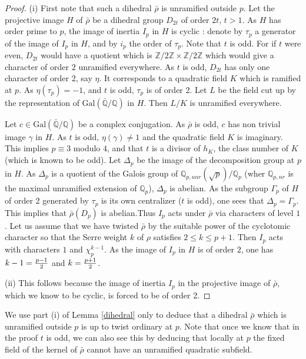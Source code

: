 \documentclass[12pt]{amsart}
\newcommand{\Q}{\mathbb{Q}}
\newcommand{\Z}{\mathbb{Z}}
\newcommand{\rhobar}{\overline{\rho}}
\def\rhobar{ {\bar {\rho} } }
\def\rhob{ {\bar {\rho} } }
\newcommand{\Galois}{\mathrm{Gal}}
\newcommand{\Gal}{\Galois( \bar{ {\mathbb Q}}/{\mathbb Q})}
\begin{document}
\begin{proof} (i) First note that such a dihedral $\rhobar$
is unramified outside $p$. Let the projective
image $H$ of $\rhobar$ be a dihedral group $D_{2t}$ of order $2t$, $t>1$.
As $H$ has order prime to $p$, the image of inertia $I_p$ in $H$ is cyclic
: denote by $\tau _p$ a generator of the image of $I_p$ in $H$, and by $i_p$ the order of $\tau_p$.
Note that $t$ is odd. For if $t$ were even, $D_{2t}$ would have
a quotient which is $\Z/2\Z \times \Z/2\Z$ which would give
a character of order $2$ unramified everywhere.
As $t$ is odd, $D_{2t}$ has only one
character of order $2$, say $\eta$. It corresponds to a quadratic
field $K$ which is ramified at $p$. As $\eta (\tau _p )=-1$,
and $t$ is odd, $\tau _p$ is of order $2$.
Let $L$ be the field cut up by the representation
of $\Gal$ in $H$. Then $L/K$ is unramified everywhere.

Let $c\in \Gal$ be a complex conjugation. As $\rhob$ is odd,
$c$ has non trivial image $\gamma$  in $H$. As $t$ is odd,
$\eta (\gamma)\neq 1$ and
the quadratic field  $K$ is imaginary. This implies
$p \equiv 3$ modulo $4$, and that $t$ is a divisor of $h_K$,
the class number of $K$ (which is known to be odd). Let $\Delta _p$ be the image of the decomposition group
at $p$ in $H$. As  $\Delta _p$ is a quotient of the Galois
group of $\Q_{p,unr}(\sqrt{p} )/\Q_p$ (wher $\Q_{p,nr}$ is the maximal unramified extension of $\Q_p$), $\Delta _p$ is
abelian. As the subgroup $\Gamma_p$ of $H$ of order $2$
generated by  $\tau _p$ is its own centralizer ($t$ is odd),
one sees that $\Delta _p=\Gamma_p$. This implies that $\rhobar(D_p)$ is abelian.Thus $I_p$ acts under
$\rhob$ via characters of level $1$.
Let us assume that we have twisted $\rhob$ by the suitable
power of the cyclotomic character so that
the Serre weight $k$ of $\rho$  satisfies $2\leq k\leq p+1$.
Then $I_p$ acts with characters $1$ and $\chi_p ^{k-1}$.
As the image of $I_p$ in $H$ is of order $2$, one has $k-1= {p-1 \over 2}$
and $k={p+1 \over 2}$.

(ii) This follows because the image of inertia $I_p$ in the projective 
image of $\rhob$, which we know to be cyclic, is forced to be of order 2.
\end{proof}

 We use part (i) of Lemma \ref{dihedral} only to
deduce that a dihedral $\rhobar$ which is unramified outside $p$ is up to twist
ordinary at $p$. Note that once we know that in the proof $t$ is odd, we can also see this by deducing that locally at $p$
the fixed field of the kernel of $\rhobar$ cannot have an unramified quadratic subfield.
\vspace{3mm}
\end{document}
